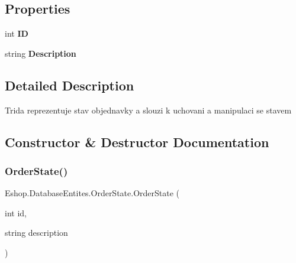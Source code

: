 \subsection*{Properties}
\begin{DoxyCompactItemize}
\item 
\mbox{\label{class_eshop_1_1_database_entites_1_1_order_state_aed9a3cc54f899f4921581d74fb0bf844}} 
int {\bfseries ID}
\item 
\mbox{\label{class_eshop_1_1_database_entites_1_1_order_state_a1a287bc58e02430632de493155ca89ad}} 
string {\bfseries Description}
\end{DoxyCompactItemize}


\subsection{Detailed Description}
Trida reprezentuje stav objednavky a slouzi k uchovani a manipulaci se stavem 



\subsection{Constructor \& Destructor Documentation}
\mbox{\label{class_eshop_1_1_database_entites_1_1_order_state_aaa3a6722e949db5d7ced3fa2dec0ec29}} 
\subsubsection{\texorpdfstring{OrderState()}{OrderState()}}
{\footnotesize\ttfamily Eshop.\+Database\+Entites.\+Order\+State.\+Order\+State (\begin{DoxyParamCaption}\item[{int}]{id,  }\item[{string}]{description }\end{DoxyParamCaption})}



